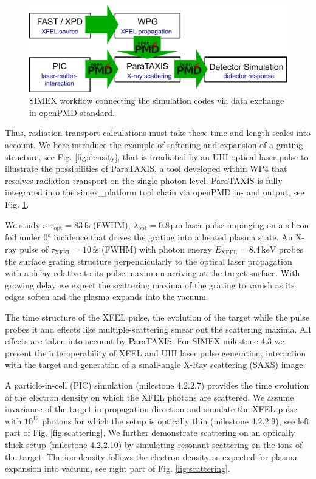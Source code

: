 \begin{figure}
\centering
  \includegraphics[width=.85\linewidth]{figures/simex_workflow_v2.png}
\caption{
SIMEX workflow connecting the simulation codes via data exchange in openPMD standard.
}
  \label{fig:workflows}
\end{figure}

Thus, radiation transport calculations must take these time and length scales
into account. We here introduce the example of softening and expansion of a
grating structure, see Fig. \ref{fig:density},  that is irradiated by an UHI
optical laser pulse to illustrate the possibilities of ParaTAXIS, a tool
developed within WP4 that resolves radiation transport on the single photon
level. ParaTAXIS is fully integrated into the simex\_platform tool chain via
openPMD \cite{Huebl2017} in- and output, see Fig. \ref{fig:workflows}.

We study a $\tau_\mathrm{opt} = 83\,\mathrm{fs}$ (FWHM), $\lambda_\mathrm{opt} =
0.8\,\mathrm{\mu m}$ laser pulse impinging on a silicon foil under 0° incidence
that drives the grating into a heated plasma state. An X-ray pulse of
$\tau_\mathrm{XFEL} = 10\,\mathrm{fs}$ (FWHM) with photon energy
$E_\mathrm{XFEL} =8.4\,\mathrm{keV}$ probes the surface grating structure
perpendicularly to the optical laser propagation with a delay relative to its
pulse maximum arriving at the target surface. With growing delay we expect the
scattering maxima of the grating to vanish as its edges soften and the plasma
expands into the vacuum.

The time structure of the XFEL pulse, the evolution of the target while the
pulse probes it and effects like multiple-scattering smear out the scattering
maxima. All effects are taken into account by ParaTAXIS. For SIMEX milestone 4.3
we present the interoperability of XFEL and UHI laser pulse generation,
interaction with the target and generation of a small-angle X-Ray scattering
(SAXS) image.

A particle-in-cell (PIC) simulation (milestone 4.2.2.7) provides the time
evolution of the electron density on which the XFEL photons are scattered. We
assume invariance of the target in propagation direction and simulate the XFEL
pulse with $10^{12}$ photons for which the setup is optically thin (milestone
4.2.2.9), see left part of Fig. \ref{fig:scattering}. We further demonstrate
scattering on an optically thick setup (milestone 4.2.2.10) by simulating
resonant scattering on the ions of the target. The ion density follows the
electron density as expected for plasma expansion into vacuum\cite{Mora2003},
see right part of Fig. \ref{fig:scattering}.

